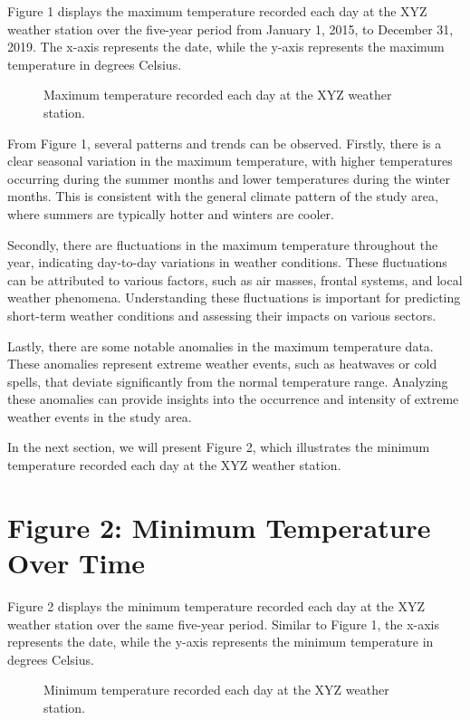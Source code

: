 \documentclass{article}
\begin{document}
Figure 1 displays the maximum temperature recorded each day at the XYZ weather station over the five-year period from January 1, 2015, to December 31, 2019. The x-axis represents the date, while the y-axis represents the maximum temperature in degrees Celsius.

\begin{figure}[h]
  \centering
  \caption{Maximum temperature recorded each day at the XYZ weather station.}
  \label{fig:max_temperature}
\end{figure}

From Figure 1, several patterns and trends can be observed. Firstly, there is a clear seasonal variation in the maximum temperature, with higher temperatures occurring during the summer months and lower temperatures during the winter months. This is consistent with the general climate pattern of the study area, where summers are typically hotter and winters are cooler.

Secondly, there are fluctuations in the maximum temperature throughout the year, indicating day-to-day variations in weather conditions. These fluctuations can be attributed to various factors, such as air masses, frontal systems, and local weather phenomena. Understanding these fluctuations is important for predicting short-term weather conditions and assessing their impacts on various sectors.

Lastly, there are some notable anomalies in the maximum temperature data. These anomalies represent extreme weather events, such as heatwaves or cold spells, that deviate significantly from the normal temperature range. Analyzing these anomalies can provide insights into the occurrence and intensity of extreme weather events in the study area.

In the next section, we will present Figure 2, which illustrates the minimum temperature recorded each day at the XYZ weather station.

\section{Figure 2: Minimum Temperature Over Time}

Figure 2 displays the minimum temperature recorded each day at the XYZ weather station over the same five-year period. Similar to Figure 1, the x-axis represents the date, while the y-axis represents the minimum temperature in degrees Celsius.

\begin{figure}[h]
  \centering
  \caption{Minimum temperature recorded each day at the XYZ weather station.}
  \label{fig:min_temperature}
\end{figure}
\end{document}
